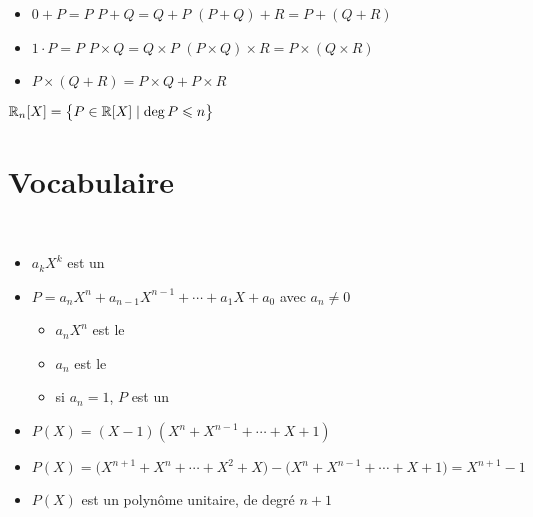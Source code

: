 \begin{frame}

\begin{proposition}
\begin{itemize}\setlength{\itemsep}{7pt} 
  \item $0+P=P$ \qquad $P+Q=Q+P$ \qquad $(P+Q)+R=P+(Q+R)$
\pause
  \item $1\cdot P = P$ \qquad $P\times Q=Q \times P$ \qquad $(P \times Q) \times R=P \times (Q \times R)$
\pause
  \item $P\times (Q+R)=P\times Q + P \times R$
\end{itemize}
\end{proposition}

\pause

\begin{proposition}
\pause
{}
\end{proposition}

\bigskip
\pause

\centerline{$\mathbb{R}_n[X]= \big\{P \in \mathbb{R}[X] \mid \deg P \leqslant n\big\}$}

\end{frame}

\section{Vocabulaire}

\begin{frame}
\begin{mydefinition} \ 
\begin{itemize}
  \item $a_kX^k$ est un 
\pause
  \item $P=a_nX^n+a_{n-1}X^{n-1}+\cdots + a_1X+a_0$ avec $a_n\neq0$
\pause  
  \begin{itemize}
    \item $a_nX^n$ est le 
\pause    
    \item $a_n$ est le  
\pause    
    \item si $a_n=1$, $P$ est un 
  \end{itemize}
\end{itemize}
\end{mydefinition}
\pause
\begin{exemple}
\begin{itemize}
  \item $P(X)=(X-1)(X^n+X^{n-1}+\cdots + X+1)$
\pause  
  \item {\small $P(X)= \big(X^{n+1}+X^{n}+\cdots + X^2+X\big) - \big(X^n+X^{n-1}+\cdots + X+1\big) = X^{n+1} - 1$}
  
\pause  
  \item $P(X)$ est un polynôme unitaire, de degré $n+1$
\end{itemize}
\end{exemple}

\end{frame}



